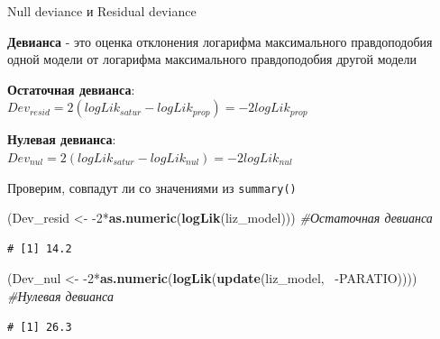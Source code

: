 \documentclass[ignorenonframetext,]{beamer}
\newenvironment{Shaded}{\begin{snugshade}}{\end{snugshade}}
\newcommand{\KeywordTok}[1]{\textcolor[rgb]{0.13,0.29,0.53}{\textbf{{#1}}}}
\newcommand{\DecValTok}[1]{\textcolor[rgb]{0.00,0.00,0.81}{{#1}}}
\newcommand{\StringTok}[1]{\textcolor[rgb]{0.31,0.60,0.02}{{#1}}}
\newcommand{\CommentTok}[1]{\textcolor[rgb]{0.56,0.35,0.01}{\textit{{#1}}}}
\newcommand{\NormalTok}[1]{{#1}}
\begin{document}
\begin{frame}[fragile]{Null deviance и Residual deviance}

\textbf{Девианса} - это оценка отклонения логарифма максимального
правдоподобия одной модели от логарифма максимального правдоподобия
другой модели

\textbf{Остаточная девианса}:\\
\(Dev_{resid} = 2(logLik_{satur} - logLik_{prop})=-2logLik_{prop}\)

\textbf{Нулевая девианса}:\\
\(Dev_{nul} = 2(logLik_{satur} - logLik_{nul})=-2logLik_{nul}\)

Проверим, совпадут ли со значениями из \texttt{summary()}

\begin{Shaded}
\begin{Highlighting}[]
\NormalTok{(Dev_resid <-}\StringTok{ }\NormalTok{-}\DecValTok{2}\NormalTok{*}\KeywordTok{as.numeric}\NormalTok{(}\KeywordTok{logLik}\NormalTok{(liz_model))) }\CommentTok{#Остаточная девианса}
\end{Highlighting}
\end{Shaded}

\begin{verbatim}
# [1] 14.2
\end{verbatim}

\begin{Shaded}
\begin{Highlighting}[]
\NormalTok{(Dev_nul <-}\StringTok{ }\NormalTok{-}\DecValTok{2}\NormalTok{*}\KeywordTok{as.numeric}\NormalTok{(}\KeywordTok{logLik}\NormalTok{(}\KeywordTok{update}\NormalTok{(liz_model, ~-PARATIO)))) }\CommentTok{#Нулевая девианса}
\end{Highlighting}
\end{Shaded}

\begin{verbatim}
# [1] 26.3
\end{verbatim}

\end{frame}
\end{document}

